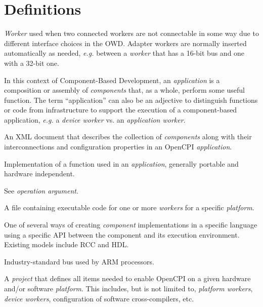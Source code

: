 \section{Definitions}
\begin{description}[style=nextline]
\item[Adapter Worker]
\textit{Worker} used when two connected workers are not connectable in some way due to different interface choices in the OWD.  Adapter workers are normally inserted automatically as needed, \textit{e.g.} between a \textit{worker} that has a 16-bit bus and one with a 32-bit one.

\item[Application]
In this context of Component-Based Development, an \textit{application} is a composition or assembly of \textit{components} that, as a whole, perform some useful function. The term ``application'' can also be an adjective to distinguish functions or code from infrastructure to support the execution of a component-based application, \textit{e.g.} a \textit{device worker} vs. an \textit{application worker}.

\item[Application Specification (OAS)]
An XML document that describes the collection of \textit{components} along with their interconnections and configuration properties in an OpenCPI \textit{application}.

\item[Application Worker]
Implementation of a function used in an \textit{application}, generally portable and hardware independent.

\item[Argument]
See \textit{operation argument}.

\item[Artifact]
A file containing executable code for one or more \textit{workers}  for a specific \textit{platform}.

\item[Authoring Model]
One of several ways of creating \textit{component} implementations in a specific language using a specific API between the component and its execution environment.  Existing models include RCC and HDL. %

\item[AXI (Advanced eXtensible Interface)]
Industry-standard bus used by ARM processors.

\item[Board Support Package]
A \textit{project} that defines all items needed to enable OpenCPI on a given hardware and/or software \textit{platform}. This includes, but is not limited to, \textit{platform workers}, \textit{device workers}, configuration of software cross-compilers, etc.


\end{description}
